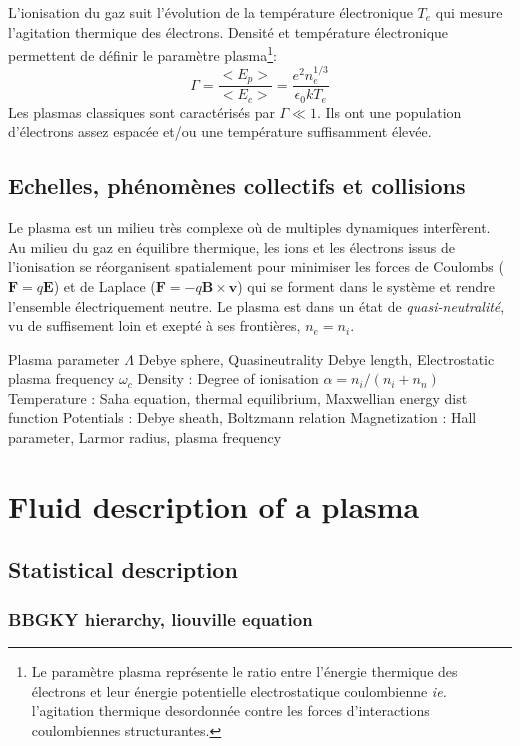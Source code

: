 			L'ionisation du gaz suit l'évolution de la température électronique $T_e$ qui
			mesure l'agitation thermique des électrons. Densité et température
			électronique permettent de définir le paramètre plasma\footnote{Le
			paramètre plasma représente le ratio entre l'énergie thermique des électrons
			et leur énergie potentielle electrostatique coulombienne \emph{ie.}
			l'agitation thermique desordonnée contre les forces d'interactions
			coulombiennes structurantes.}:
				$$\Gamma=\frac{<E_p>}{<E_c>}=\frac{e^2n_e^{1/3}}{\epsilon_0 kT_e}$$
			Les plasmas classiques sont caractérisés par $\Gamma\ll 1$. Ils ont une
			population d'électrons assez espacée et/ou une température suffisamment élevée. 
			
		\subsection{Echelles, phénomènes collectifs et collisions}
			Le plasma est un milieu très complexe où de multiples dynamiques interfèrent. 
			Au milieu du gaz en équilibre thermique, les ions et les électrons issus
			de l'ionisation se réorganisent spatialement pour minimiser les forces
			de Coulombs ($\mathbf F=q\mathbf E$) et de Laplace ($\mathbf F=-q\mathbf
			B\times\mathbf v$) qui se forment dans le système et rendre l'ensemble
			électriquement neutre. Le plasma est dans un état de \emph{quasi-neutralité}, 
			\ie vu de suffisement loin et exepté à ses frontières, $n_e=n_i$.
			
			
		 Plasma parameter $\Lambda$ Debye sphere, Quasineutrality Debye length,
		Electrostatic plasma frequency $\omega_c$
		 Density : Degree of ionisation $\alpha=n_i/(n_i+n_n)$
			Temperature : Saha equation, thermal equilibrium, Maxwellian energy dist function
			Potentials : Debye sheath, Boltzmann relation
			Magnetization : Hall parameter, Larmor radius, plasma frequency
		
	\section{Fluid description of a plasma}
		\subsection{Statistical description}
			\subsubsection{BBGKY hierarchy, liouville equation}
